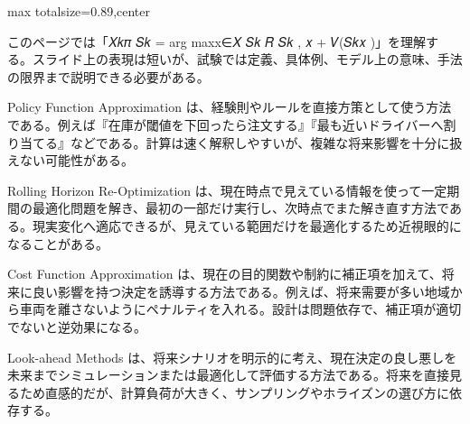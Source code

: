 \begin{minipage}[t]{0.58\textwidth}
\begin{adjustbox}{max totalsize={\textwidth}{0.89\textheight},center}
\begin{minipage}{\textwidth}\scriptsize
{}このページでは「𝑋𝑘𝜋 𝑆𝑘 = arg maxx∈𝑋 𝑆𝑘 𝑅 𝑆𝑘 , 𝑥 + 𝑉(𝑆𝑘𝑥 )」を理解する。スライド上の表現は短いが、試験では定義、具体例、モデル上の意味、手法の限界まで説明できる必要がある。\par
Policy Function Approximation は、経験則やルールを直接方策として使う方法である。例えば『在庫が閾値を下回ったら注文する』『最も近いドライバーへ割り当てる』などである。計算は速く解釈しやすいが、複雑な将来影響を十分に扱えない可能性がある。\par
Rolling Horizon Re-Optimization は、現在時点で見えている情報を使って一定期間の最適化問題を解き、最初の一部だけ実行し、次時点でまた解き直す方法である。現実変化へ適応できるが、見えている範囲だけを最適化するため近視眼的になることがある。\par
Cost Function Approximation は、現在の目的関数や制約に補正項を加えて、将来に良い影響を持つ決定を誘導する方法である。例えば、将来需要が多い地域から車両を離さないようにペナルティを入れる。設計は問題依存で、補正項が適切でないと逆効果になる。\par
Look-ahead Methods は、将来シナリオを明示的に考え、現在決定の良し悪しを未来までシミュレーションまたは最適化して評価する方法である。将来を直接見るため直感的だが、計算負荷が大きく、サンプリングやホライズンの選び方に依存する。\par

\end{minipage}
\end{adjustbox}
\end{minipage}

